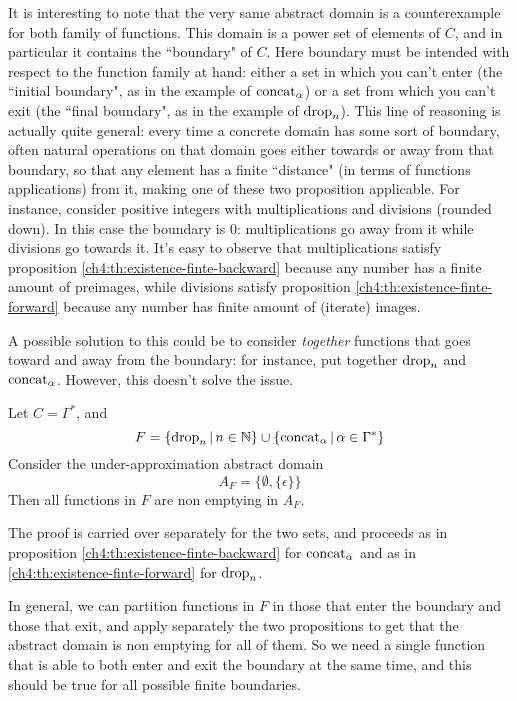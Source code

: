 It is interesting to note that the very same abstract domain is a counterexample for both family of functions. This domain is a power set of elements of $C$, and in particular it contains the ``boundary" of $C$. Here boundary must be intended with respect to the function family at hand: either a set in which you can't enter (the ``initial boundary", as in the example of $\text{concat}_{\alpha}$) or a set from which you can't exit (the ``final boundary", as in the example of $\text{drop}_n$).
This line of reasoning is actually quite general: every time a concrete domain has some sort of boundary, often natural operations on that domain goes either towards or away from that boundary, so that any element has a finite ``distance" (in terms of functions applications) from it, making one of these two proposition applicable.
For instance, consider positive integers with multiplications and divisions (rounded down). In this case the boundary is $0$: multiplications go away from it while divisions go towards it. It's easy to observe that multiplications satisfy proposition \ref{ch4:th:existence-finte-backward} because any number has a finite amount of preimages, while divisions satisfy proposition \ref{ch4:th:existence-finte-forward} because any number has finite amount of (iterate) images.

A possible solution to this could be to consider \textit{together} functions that goes toward and away from the boundary: for instance, put together $\text{drop}_n$ and $\text{concat}_{\alpha}$. However, this doesn't solve the issue.
\begin{example}
	Let $C = \Gamma^*$, and
	\[
	F = \{ \text{drop}_n \,\vert\, n \in \mathbb{N} \} \cup \{ \text{concat}_{\alpha} \,\vert\, \alpha \in \Gamma^* \}
	\]
	Consider the under-approximation abstract domain
	\[
	A_F = \{ \emptyset, \{ \epsilon \} \}
	\]
	Then all functions in $F$ are non emptying in $A_F$.

	The proof is carried over separately for the two sets, and proceeds as in proposition \ref{ch4:th:existence-finte-backward} for $\text{concat}_{\alpha}$ and as in \ref{ch4:th:existence-finte-forward} for $\text{drop}_n$.
\end{example}
In general, we can partition functions in $F$ in those that enter the boundary and those that exit, and apply separately the two propositions to get that the abstract domain is non emptying for all of them. So we need a single function that is able to both enter and exit the boundary at the same time, and this should be true for all possible finite boundaries.

